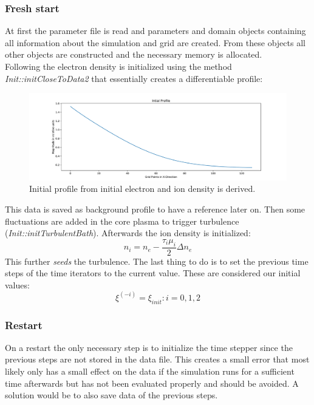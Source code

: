 \documentclass[master.tex]{subfiles}
\begin{document}
\subsubsection{Fresh start}
At first the parameter file is read and parameters and domain objects containing all information about the simulation and grid are created. From these objects all other objects are constructed and the necessary memory is allocated.\\
Following the electron density is initialized using the method \textit{Init::initCloseToData2} that essentially creates a differentiable profile:
\begin{figure}[!hbt]
    \centering
    \includegraphics[width=\linewidth]{pdfs/initial_profile.pdf}
    \caption{Initial profile from initial electron and ion density is derived.}
    \label{fig:initial_profile}
\end{figure}

This data is saved as background profile to have a reference later on.
Then some fluctuations are added in the core plasma to trigger turbulence (\textit{Init::initTurbulentBath}). Afterwards the ion density is initialized:
\begin{equation}
    n_i = n_e - \frac{\tau_i \mu_i}{2} \Delta n_e
\end{equation}
This further \textit{seeds} the turbulence. The last thing to do is to set the previous time steps of the time iterators to the current value. These are considered our initial values:
\begin{equation}
    \xi^{(-i)} = \xi_{init} \colon i = 0, 1, 2
\end{equation}


\subsubsection{Restart}
On a restart the only necessary step is to initialize the time stepper since the previous steps are not stored in the data file. This creates a small error that most likely only has a small effect on the data if the simulation runs for a sufficient time afterwards but has not been evaluated properly and should be avoided. A solution would be to also save data of the previous steps.
\end{document}
